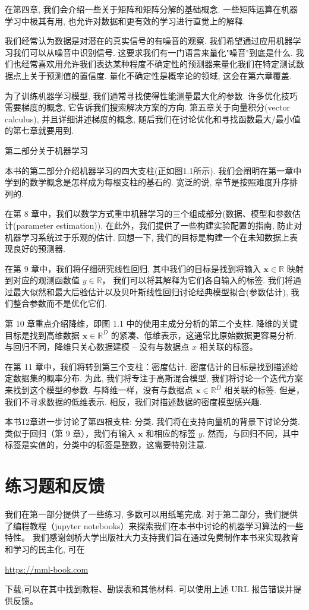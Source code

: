 在第四章, 我们会介绍一些关于矩阵和矩阵分解的基础概念.
一些矩阵运算在机器学习中极其有用, 也允许对数据和更有效的学习进行直觉上的解释.

我们经常认为数据是对潜在的真实信号的有噪音的观察.
我们希望通过应用机器学习我们可以从噪音中识别信号.
这要求我们有一门语言来量化"噪音"到底是什么.
我们也经常喜欢用允许我们表达某种程度不确定性的预测器来量化我们在特定测试数据点上关于预测值的置信度.
量化不确定性是概率论的领域, 这会在第六章覆盖.

为了训练机器学习模型, 我们通常寻找使得性能测量最大化的参数.
许多优化技巧需要梯度的概念, 它告诉我们搜索解决方案的方向.
第五章关于向量积分(vector calculus), 并且详细讲述梯度的概念, 随后我们在讨论优化和寻找函数最大/最小值的第七章就要用到.

\begin{center}
	第二部分关于机器学习
\end{center}
本书的第二部分介绍机器学习的四大支柱(正如图1.1所示).
我们会阐明在第一章中学到的数学概念是怎样成为每根支柱的基石的.
宽泛的说, 章节是按照难度升序排列的.

在第 8 章中，我们以数学方式重申机器学习的三个组成部分(数据、模型和参数估计(parameter estimation)).
在此外，我们提供了一些构建实验配置的指南, 防止对机器学习系统过于乐观的估计.
回想一下, 我们的目标是构建一个在未知数据上表现良好的预测器.

在第 9 章中，我们将仔细研究线性回归,
其中我们的目标是找到将输入 $\boldsymbol{x} \in \mathbb{R}$ 映射到对应的观测函数值 $y \in \mathbb{R}$，
我们可以将其解释为它们各自输入的标签.
我们将通过最大似然和最大后验估计以及贝叶斯线性回归讨论经典模型拟合(参数估计), 我们整合参数而不是优化它们.

第 10 章重点介绍降维，即图 1.1 中的使用主成分分析的第二个支柱.
降维的关键目标是找到高维数据 $\boldsymbol{x} \in \mathbb{R}^D$ 的紧凑、低维表示，这通常比原始数据更容易分析.
与回归不同，降维只关心数据建模 -- 没有与数据点 $x$ 相关联的标签。

在第 11 章中，我们将转到第三个支柱：密度估计.
密度估计的目标是找到描述给定数据集的概率分布.
为此, 我们将专注于高斯混合模型, 我们将讨论一个迭代方案来找到这个模型的参数.
与降维一样，没有与数据点 $\boldsymbol{x} \in \mathbb{R}^D$ 相关联的标签.
但是，我们不寻求数据的低维表示.
相反，我们对描述数据的密度模型感兴趣.

本书12章进一步讨论了第四根支柱: 分类.
我们将在支持向量机的背景下讨论分类.
类似于回归（第 9 章），我们有输入 $\boldsymbol{x}$ 和相应的标签 $y$.
然而，与回归不同，其中标签是实值的，分类中的标签是整数，这需要特别注意.

\section{练习题和反馈}

我们在第一部分提供了一些练习, 多数可以用纸笔完成.
对于第二部分，我们提供了编程教程（jupyter notebooks）来探索我们在本书中讨论的机器学习算法的一些特性。
我们感谢剑桥大学出版社大力支持我们旨在通过免费制作本书来实现教育和学习的民主化, 可在 
\begin{center}
	\url{https://mml-book.com}
\end{center}
下载,可以在其中找到教程、勘误表和其他材料.
可以使用上述 URL 报告错误并提供反馈。
